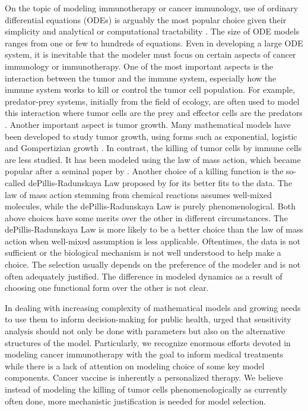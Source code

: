 \documentclass[review,authoryear]{elsarticle}
\begin{document}
On the topic of modeling immunotherapy or cancer immunology, use of ordinary differential equations (ODEs) is arguably the most popular choice
given their simplicity and analytical or computational tractability
\citep{Eftimie2010}. The size of ODE models ranges from one or few
to hundreds of equations. Even in developing a large
ODE system, it is inevitable that the modeler must focus on certain
aspects of cancer immunology or immunotherapy. One of the most important
aspects is the interaction between the tumor and the immune system, especially
how the immune system works to kill or control the tumor cell population. For example, predator-prey
systems, initially from the field of ecology, are often used to model this interaction where tumor cells
are the prey and effector cells are the predators \citep{Hamilton2022}. Another important aspect is tumor growth. Many mathematical
models have been developed to study tumor growth, using forms such as exponential, logistic and Gompertizian
growth \citep{Murphy2016}. In contrast, the killing of tumor cells
by immune cells are less studied. It has been modeled using
the law of mass action, which became popular after a seminal paper by \citet{KUZNETSOV1994}.
Another choice of a killing function is the so-called dePillis-Radunskaya
Law proposed by \citet{dePillis2014} for its better fits to the data. The law of mass action stemming from chemical reactions assumes well-mixed molecules, while the dePillis-Radunskaya
Law is purely phenomenological. Both above choices have some merits over the other in different
circumstances. The dePillis-Radunskaya Law is more likely to be a
better choice than the law of mass action when well-mixed
assumption is less applicable. Oftentimes, the data is not sufficient or the biological mechanism is not well understood to help make a choice. The selection usually depends on the preference
of the modeler and is not often adequately justified. The difference in modeled dynamics
as a result of choosing one functional form over the other is not
clear. 

In dealing with increasing complexity of mathematical models and growing
needs to use them to inform decision-making for public health, \citet{Basu2013} urged that sensitivity analysis should
not only be done with parameters but also on the alternative structures
of the model. Particularly, we recognize enormous efforts devoted
in modeling cancer immunotherapy with the goal to inform medical treatments
while there is a lack of attention on modeling choice of some key
model components. Cancer vaccine is inherently a personalized
therapy. We believe instead of modeling the killing of tumor cells phenomenologically as currently often done, more mechanistic justification
is needed for model selection.
\end{document}
